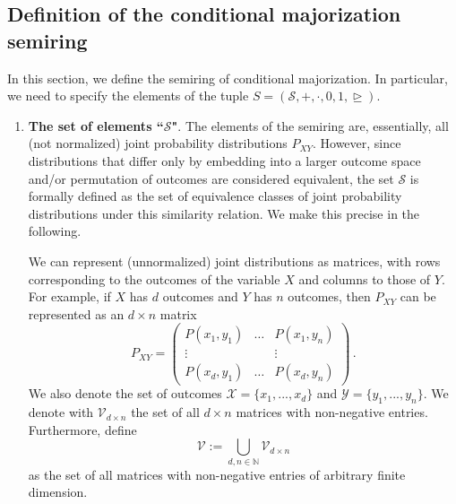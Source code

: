 \documentclass[aps,pra,11pt,onecolumn,nofootinbib,tightenlines]{revtex4-2}
\theoremstyle{definition}
\newcommand{\cS}{\mathcal{S}}
\newcommand{\X}{\mathcal{X}}
\newcommand{\Y}{\mathcal{Y}}
\newcommand{\rgeq}{\trianglerighteq}
\begin{document}
\subsection{Definition of the conditional majorization semiring}
In this section, we define the semiring of conditional majorization. In particular, we need to specify the elements of the tuple $S=(\mathcal{S}, +, \cdot, 0, 1, \rgeq)$.

\begin{enumerate}

\item \textbf{The set of elements ``$\cS$"}. The elements of the semiring are, essentially, all (not normalized) joint probability distributions $P_{XY}$.
However, since distributions that differ only by embedding into a larger outcome space and/or permutation of outcomes are considered equivalent, the set $\cS$ is formally defined as the set of equivalence classes of joint probability distributions under this similarity relation. 
We make this precise in the following.

We can represent (unnormalized) joint distributions as matrices, with rows corresponding to the outcomes of the variable $X$ and columns to those of $Y$. For example, if $X$ has $d$ outcomes and $Y$ has $n$ outcomes, then $P_{XY}$ can be represented as an $d \times n$ matrix
\begin{equation}
P_{XY} = \begin{pmatrix}
P(x_1,y_1) & \hdots & P(x_1,y_n) \\
\vdots &  & \vdots \\
P(x_d,y_1) & \hdots & P(x_d,y_n) 
\end{pmatrix} \,.
\end{equation}
We also denote the set of outcomes $\X=\{x_1,...,x_d\}$ and $\Y=\{y_1,...,y_n\}$.
We denote with $\mathcal{V}_{d \times n}$ the set of all $d \times n$ matrices with non-negative entries. Furthermore, define
\begin{equation}
    \mathcal{V} := \bigcup_{d,n \in \mathbb{N}} \mathcal{V}_{d \times n}
\end{equation}
as the set of all matrices with non-negative entries of arbitrary finite dimension.


\end{enumerate}
\end{document}
